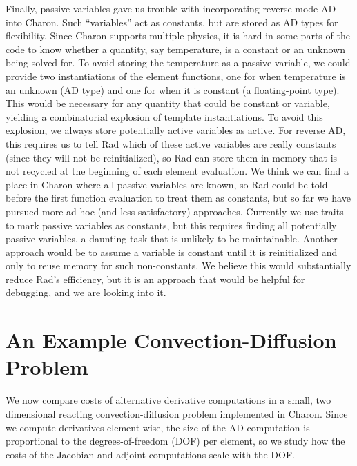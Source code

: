 \documentclass{llncs}
\begin{document}
Finally, passive variables gave us trouble with
incorporating reverse-mode AD into Charon.  Such ``variables''
act as constants, but are stored as AD types for
flexibility.  Since Charon supports multiple physics,
it is hard in some parts of the code to know whether a quantity,
say temperature, is a constant or an unknown being solved for.
To avoid storing the
temperature as a passive variable, we could provide
two instantiations of the element functions, one for when
temperature is an unknown
(AD type) and one for when it is constant (a floating-point type).
This would be necessary
for any quantity that could be constant or variable, yielding a
combinatorial explosion of template instantiations.
To avoid this explosion, we always store potentially active variables
as active.
For reverse AD, this requires us to tell Rad which of these active
variables are really constants (since they will not be reinitialized), so
Rad can store them in memory that is not recycled at the beginning
of each element evaluation.  We think we can find a place in
Charon where all passive variables are known, so Rad could be
told before the first function evaluation to treat them as constants,
but so far we have pursued more ad-hoc (and less satisfactory) approaches.
Currently we use traits to mark passive variables as
constants, but this requires
finding all potentially passive variables, a daunting task that is
unlikely to be maintainable.
Another approach would be
to assume a variable is constant until it is reinitialized and only to
reuse memory for such non-constants.  We believe this would
substantially reduce Rad's efficiency, but it is an approach that
would be helpful for debugging, and we are looking into it.

\section{An Example Convection-Diffusion Problem}
\label{sect:charon}

We now compare costs of alternative derivative computations
in a
small, two dimensional reacting convection-diffusion problem implemented in
Charon.  Since we compute derivatives element-wise, the size of
the AD computation is proportional to the degrees-of-freedom (DOF)
per element, so we study how the costs of the Jacobian and
adjoint computations scale with the DOF.
\end{document}
